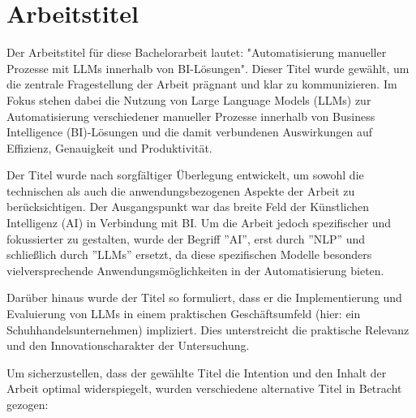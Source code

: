 

\section{Arbeitstitel}

Der Arbeitstitel für diese Bachelorarbeit lautet: "Automatisierung manueller Prozesse mit LLMs innerhalb von BI-Lösungen". Dieser Titel wurde gewählt, um die zentrale Fragestellung der Arbeit prägnant und klar zu kommunizieren. Im Fokus stehen dabei die Nutzung von Large Language Models (LLMs) zur Automatisierung verschiedener manueller Prozesse innerhalb von Business Intelligence (BI)-Lösungen und die damit verbundenen Auswirkungen auf Effizienz, Genauigkeit und Produktivität.

Der Titel wurde nach sorgfältiger Überlegung entwickelt, um sowohl die technischen als auch die anwendungsbezogenen Aspekte der Arbeit zu berücksichtigen. Der Ausgangspunkt war das breite Feld der Künstlichen Intelligenz (AI) in Verbindung mit BI. Um die Arbeit jedoch spezifischer und fokussierter zu gestalten, wurde der Begriff ''AI'', erst durch ''NLP'' und schließlich durch ''LLMs'' ersetzt, da diese spezifischen Modelle besonders vielversprechende Anwendungsmöglichkeiten in der Automatisierung bieten.

Darüber hinaus wurde der Titel so formuliert, dass er die Implementierung und Evaluierung von LLMs in einem praktischen Geschäftsumfeld (hier: ein Schuhhandelsunternehmen) impliziert. Dies unterstreicht die praktische Relevanz und den Innovationscharakter der Untersuchung.

Um sicherzustellen, dass der gewählte Titel die Intention und den Inhalt der Arbeit optimal widerspiegelt, wurden verschiedene alternative Titel in Betracht gezogen:

